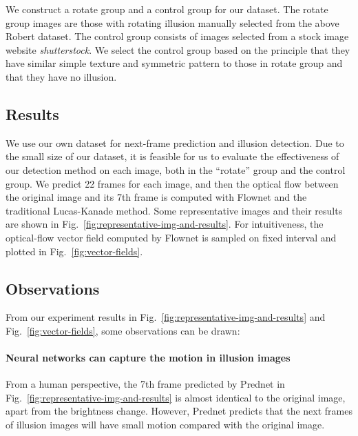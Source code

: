 \documentclass[journal]{IEEEtran}
\begin{document}
We construct a rotate group and a control group for our dataset. The rotate group images are those with rotating illusion manually selected from the above Robert dataset. The control group consists of images selected from a stock image website \emph{shutterstock}. We select the control group based on the principle that they have similar simple texture and symmetric pattern to those in rotate group and that they have no illusion.

\subsection{Results}

We use our own dataset for next-frame prediction and illusion detection. Due to the small size of our dataset, it is feasible for us to evaluate the effectiveness of our detection method on each image, both in the ``rotate'' group and the control group. We predict 22 frames for each image, and then the optical flow between the original image and its 7th frame is computed with Flownet and the traditional Lucas-Kanade method. Some representative images and their results are shown in Fig.~\ref{fig:representative-img-and-results}. For intuitiveness, the optical-flow vector field computed by Flownet is sampled on fixed interval and plotted in Fig.~\ref{fig:vector-fields}.

\subsection{Observations}

From our experiment results in Fig.~\ref{fig:representative-img-and-results} and Fig.~\ref{fig:vector-fields}, some observations can be drawn:

\paragraph{Neural networks can capture the motion in illusion images} From a human perspective, the 7th frame predicted by Prednet in Fig.~\ref{fig:representative-img-and-results} is almost identical to the original image, apart from the brightness change. However, Prednet predicts that the next frames of illusion images will have small motion compared with the original image.
\end{document}
